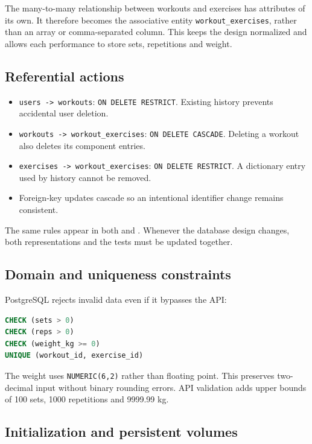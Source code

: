\documentclass[11pt,a4paper]{article}
\newcommand{\filepath}[1]{\path{#1}}
\begin{document}
The many-to-many relationship between workouts and exercises has attributes of
its own. It therefore becomes the associative entity
\texttt{workout\_exercises}, rather than an array or comma-separated column.
This keeps the design normalized and allows each performance to store sets,
repetitions and weight.

\subsection{Referential actions}

\begin{itemize}
  \item \texttt{users -> workouts}: \texttt{ON DELETE RESTRICT}. Existing history prevents accidental user deletion.
  \item \texttt{workouts -> workout\_exercises}: \texttt{ON DELETE CASCADE}. Deleting a workout also deletes its component entries.
  \item \texttt{exercises -> workout\_exercises}: \texttt{ON DELETE RESTRICT}. A dictionary entry used by history cannot be removed.
  \item Foreign-key updates cascade so an intentional identifier change remains consistent.
\end{itemize}

The same rules appear in both \filepath{init.sql} and \filepath{models.py}.
Whenever the database design changes, both representations and the tests must
be updated together.

\subsection{Domain and uniqueness constraints}

PostgreSQL rejects invalid data even if it bypasses the API:

\begin{lstlisting}[language=SQL,caption={Core database constraints}]
CHECK (sets > 0)
CHECK (reps > 0)
CHECK (weight_kg >= 0)
UNIQUE (workout_id, exercise_id)
\end{lstlisting}

The weight uses \texttt{NUMERIC(6,2)} rather than floating point. This preserves
two-decimal input without binary rounding errors. API validation adds upper
bounds of 100 sets, 1000 repetitions and 9999.99 kg.

\subsection{Initialization and persistent volumes}
\end{document}
